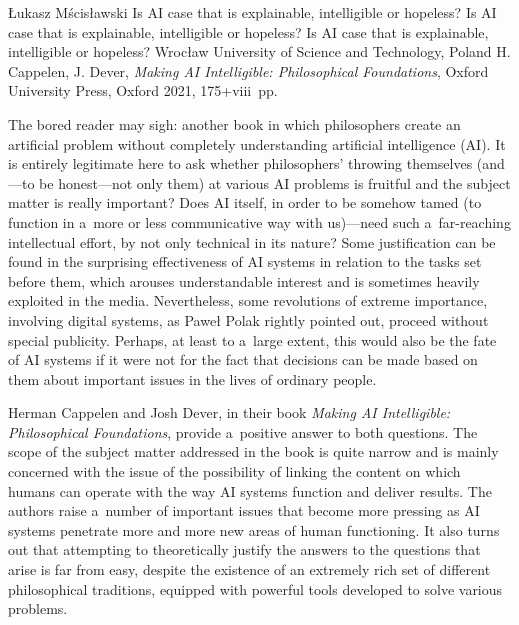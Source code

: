 \begin{newrevengenv}{Łukasz Mścisławski}
	{Is AI case that is explainable, intelligible or hopeless?}
	{Is AI case that is explainable, intelligible or hopeless?}
	{Is AI case that is explainable, intelligible or hopeless?}
	{Wrocław University of Science and Technology, Poland}
	{H. Cappelen, J. Dever, \textit{Making AI Intelligible: Philosophical Foundations}, Oxford University Press, Oxford 2021, 175+viii~pp.}


\lettrine[loversize=0.13,lines=2,lraise=-0.03,nindent=0em,findent=0.2pt]%
{T}{}he bored reader may sigh: another book in which philosophers create an artificial problem without completely understanding artificial intelligence (AI). It is entirely legitimate here to ask whether philosophers' throwing themselves (and---to be honest---not only them) at various AI problems is fruitful and the subject matter is really important? Does AI itself, in order to be somehow tamed (to function in a~more or less communicative way with us)---need such a~far-reaching intellectual effort, by not only technical in its nature? Some justification can be found in the surprising effectiveness of AI systems in relation to the tasks set before them, which arouses understandable interest and is sometimes heavily exploited in the media. Nevertheless, some revolutions of extreme importance, involving digital systems, as Paweł Polak
\parencite*[][p.151]{polak_bezglosna_2015} %
 rightly pointed out, proceed without special publicity. Perhaps, at least to a~large extent, this would also be the fate of AI systems if it were not for the fact that decisions can be made based on them about important issues in the lives of ordinary people.

Herman Cappelen and Josh Dever, in their book \textit{Making AI Intelligible: Philosophical Foundations}, provide a~positive answer to both questions. The scope of the subject matter addressed in the book is quite narrow and is mainly concerned with the issue of the possibility of linking the content on which humans can operate with the way AI systems function and deliver results. The authors raise a~number of important issues that become more pressing as AI systems penetrate more and more new areas of human functioning. It also turns out that attempting to theoretically justify the answers to the questions that arise is far from easy, despite the existence of an extremely rich set of different philosophical traditions, equipped with powerful tools developed to solve various problems.


\end{newrevengenv}
